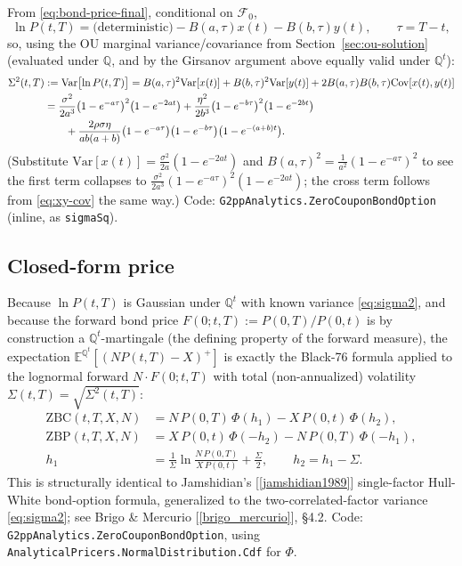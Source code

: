 \documentclass[11pt,a4paper]{article}
\newcommand{\E}{\mathbb{E}}
\newcommand{\Q}{\mathbb{Q}}
\newcommand{\Qt}{\mathbb{Q}^t}
\newcommand{\F}{\mathcal{F}}
\newcommand{\Var}{\mathrm{Var}}
\newcommand{\Cov}{\mathrm{Cov}}
\newcommand{\coderef}[1]{\texttt{\color{blue!60!black}#1}}
\theoremstyle{definition}
\begin{document}
From \eqref{eq:bond-price-final}, conditional on $\F_0$,
\[
  \ln P(t,T) = \text{(deterministic)} - B(a,\tau)x(t) - B(b,\tau)y(t), \qquad \tau=T-t,
\]
so, using the OU marginal variance/covariance from
Section~\ref{sec:ou-solution} (evaluated under $\Q$, and by the Girsanov
argument above equally valid under $\Qt$):
{\small
\begin{align}
  \Sigma^2(t,T) &:= \Var\bigl[\ln P(t,T)\bigr]
   = B(a,\tau)^2\Var[x(t)] + B(b,\tau)^2\Var[y(t)] + 2B(a,\tau)B(b,\tau)\Cov[x(t),y(t)] \notag\\
   &= \frac{\sigma^2}{2a^3}\bigl(1-e^{-a\tau}\bigr)^2\bigl(1-e^{-2at}\bigr)
    + \frac{\eta^2}{2b^3}\bigl(1-e^{-b\tau}\bigr)^2\bigl(1-e^{-2bt}\bigr) \notag\\
   &\qquad + \frac{2\rho\sigma\eta}{ab(a+b)}\bigl(1-e^{-a\tau}\bigr)\bigl(1-e^{-b\tau}\bigr)\bigl(1-e^{-(a+b)t}\bigr).
  \label{eq:sigma2}
\end{align}}
(Substitute $\Var[x(t)]=\tfrac{\sigma^2}{2a}(1-e^{-2at})$ and
$B(a,\tau)^2=\tfrac{1}{a^2}(1-e^{-a\tau})^2$ to see the first term collapses
to $\tfrac{\sigma^2}{2a^3}(1-e^{-a\tau})^2(1-e^{-2at})$; the cross term
follows from \eqref{eq:xy-cov} the same way.) Code:
\coderef{G2ppAnalytics.ZeroCouponBondOption} (inline, as \texttt{sigmaSq}).

\subsection{Closed-form price}

Because $\ln P(t,T)$ is Gaussian under $\Qt$ with known variance
\eqref{eq:sigma2}, and because the forward bond price
$F(0;t,T):=P(0,T)/P(0,t)$ is by construction a $\Qt$-martingale (the
defining property of the forward measure), the expectation
$\E^{\Qt}[(NP(t,T)-X)^+]$ is exactly the Black-76 formula applied to the
lognormal forward $N\cdot F(0;t,T)$ with total (non-annualized) volatility
$\Sigma(t,T)=\sqrt{\Sigma^2(t,T)}$:
\begin{equation}
  \boxed{\;
  \begin{aligned}
    \text{ZBC}(t,T,X,N) &= N\,P(0,T)\,\Phi(h_1) - X\,P(0,t)\,\Phi(h_2), \\
    \text{ZBP}(t,T,X,N) &= X\,P(0,t)\,\Phi(-h_2) - N\,P(0,T)\,\Phi(-h_1), \\
    h_1 &= \frac{1}{\Sigma}\ln\!\frac{N\,P(0,T)}{X\,P(0,t)} + \frac{\Sigma}{2}, \qquad
    h_2 = h_1 - \Sigma.
  \end{aligned}\;}
  \label{eq:zbo-formula}
\end{equation}
This is structurally identical to Jamshidian's [\ref{jamshidian1989}]
single-factor Hull-White bond-option formula, generalized to the
two-correlated-factor variance \eqref{eq:sigma2}; see Brigo \& Mercurio
[\ref{brigo_mercurio}], \S4.2. Code:
\coderef{G2ppAnalytics.ZeroCouponBondOption}, using
\coderef{AnalyticalPricers.NormalDistribution.Cdf} for $\Phi$.
\end{document}
